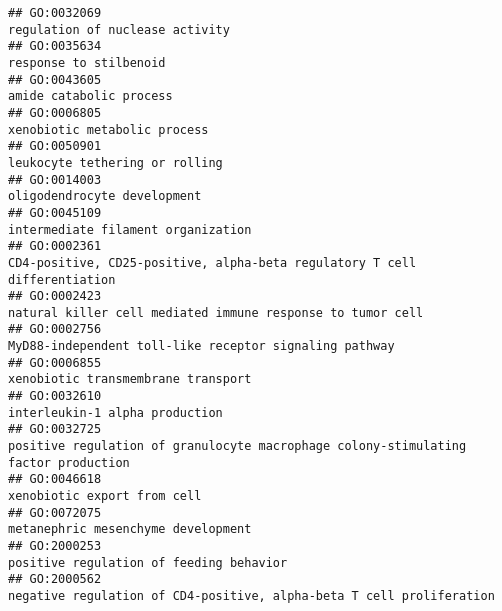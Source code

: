 \documentclass[
]{article}
\begin{document}
\begin{verbatim}
## GO:0032069                                                                                                                  regulation of nuclease activity
## GO:0035634                                                                                                                           response to stilbenoid
## GO:0043605                                                                                                                          amide catabolic process
## GO:0006805                                                                                                                     xenobiotic metabolic process
## GO:0050901                                                                                                                   leukocyte tethering or rolling
## GO:0014003                                                                                                                      oligodendrocyte development
## GO:0045109                                                                                                               intermediate filament organization
## GO:0002361                                                                        CD4-positive, CD25-positive, alpha-beta regulatory T cell differentiation
## GO:0002423                                                                                       natural killer cell mediated immune response to tumor cell
## GO:0002756                                                                                           MyD88-independent toll-like receptor signaling pathway
## GO:0006855                                                                                                               xenobiotic transmembrane transport
## GO:0032610                                                                                                                   interleukin-1 alpha production
## GO:0032725                                                               positive regulation of granulocyte macrophage colony-stimulating factor production
## GO:0046618                                                                                                                      xenobiotic export from cell
## GO:0072075                                                                                                               metanephric mesenchyme development
## GO:2000253                                                                                                          positive regulation of feeding behavior
## GO:2000562                                                                             negative regulation of CD4-positive, alpha-beta T cell proliferation

\end{verbatim}
\end{document}
